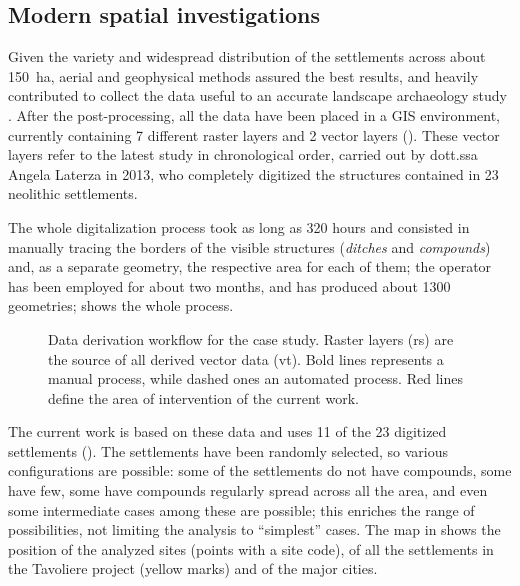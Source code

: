         \subsection{Modern spatial investigations}
            Given the variety and widespread distribution of the settlements across about \SI{150}{\hectare}, aerial and geophysical methods assured the best results, and heavily contributed to collect the data useful to an accurate landscape archaeology study \cite[pp.~45--48]{remote-ciminale}. After the post-processing, all the data have been placed in a GIS environment, currently containing 7 different raster layers and 2 vector layers (). These vector layers refer to the latest study in chronological order, carried out by dott.ssa Angela Laterza in 2013,
            who completely digitized the structures contained in 23 neolithic settlements. 
            
            The whole digitalization process took as long as 320 hours and consisted in manually tracing the borders of the visible structures (\emph{ditches} and \emph{compounds}) and, as a separate geometry, the respective area for each of them; the operator has been employed for about two months, and has produced about 1300 geometries;  shows the whole process.

            \begin{figure}[H]
                \caption[Data deriving workflow for the Tavoliere project]{Data derivation workflow for the case study. Raster layers (\textsf{rs}) are the source of all derived vector data (\textsf{vt}). Bold lines represents a manual process, while dashed ones an automated process. Red lines define the area of intervention of the current work.}
                \label{fig:scheme-derive}
            \end{figure}

            The current work is based on these data and uses 11 of the 23 digitized settlements (). The settlements have been randomly selected, so various configurations are possible: some of the settlements do not have compounds, some have few, some have compounds regularly spread across all the area, and even some intermediate cases among these are possible; this enriches the range of possibilities, not limiting the analysis to ``simplest'' cases. The map in  shows the position of the analyzed sites (points with a site code), of all the settlements in the Tavoliere project (yellow marks) and of the major cities.
            

